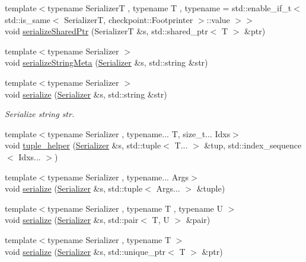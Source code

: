 \begin{DoxyCompactItemize}
\item 
{\footnotesize template$<$typename SerializerT , typename T , typename  = std\+::enable\+\_\+if\+\_\+t$<$    std\+::is\+\_\+same$<$      Serializer\+T,      checkpoint\+::\+Footprinter    $>$\+::value  $>$$>$ }\\void \hyperlink{namespacecheckpoint_a523f35e77c4dbca4a7653184d2b94a6f}{serialize\+Shared\+Ptr} (SerializerT \&s, std\+::shared\+\_\+ptr$<$ T $>$ \&ptr)
\item 
{\footnotesize template$<$typename Serializer $>$ }\\void \hyperlink{namespacecheckpoint_a1ea8e1ef9d0a10d26df77cb5309435aa}{serialize\+String\+Meta} (\hyperlink{structcheckpoint_1_1_serializer}{Serializer} \&s, std\+::string \&str)
\item 
{\footnotesize template$<$typename Serializer $>$ }\\void \hyperlink{namespacecheckpoint_aef8e8717e4cc129379525653730c4eba}{serialize} (\hyperlink{structcheckpoint_1_1_serializer}{Serializer} \&s, std\+::string \&str)
\begin{DoxyCompactList}\small\item\em Serialize string {\ttfamily str}. \end{DoxyCompactList}\item 
{\footnotesize template$<$typename Serializer , typename... T, size\+\_\+t... Idxs$>$ }\\void \hyperlink{namespacecheckpoint_ab763d3ca9396ff9a1896f5da6c2b3c54}{tuple\+\_\+helper} (\hyperlink{structcheckpoint_1_1_serializer}{Serializer} \&s, std\+::tuple$<$ T... $>$ \&tup, std\+::index\+\_\+sequence$<$ Idxs... $>$)
\item 
{\footnotesize template$<$typename Serializer , typename... Args$>$ }\\void \hyperlink{namespacecheckpoint_a7ac21fa6ad08fd64a47c789c32966019}{serialize} (\hyperlink{structcheckpoint_1_1_serializer}{Serializer} \&s, std\+::tuple$<$ Args... $>$ \&tuple)
\item 
{\footnotesize template$<$typename Serializer , typename T , typename U $>$ }\\void \hyperlink{namespacecheckpoint_a7b5c3ff67d3f7b65cfb46da7617e87ad}{serialize} (\hyperlink{structcheckpoint_1_1_serializer}{Serializer} \&s, std\+::pair$<$ T, U $>$ \&pair)
\item 
{\footnotesize template$<$typename Serializer , typename T $>$ }\\void \hyperlink{namespacecheckpoint_a3af28ec72bdc4efb0185562379ea3f8d}{serialize} (\hyperlink{structcheckpoint_1_1_serializer}{Serializer} \&s, std\+::unique\+\_\+ptr$<$ T $>$ \&ptr)

\end{DoxyCompactItemize}
